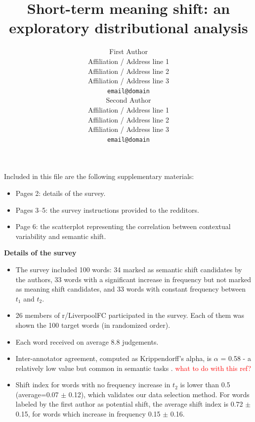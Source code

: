 \documentclass[11pt,a4paper]{article}
\title{Short-term meaning shift: an exploratory distributional analysis}
\author{First Author \\
  Affiliation / Address line 1 \\
  Affiliation / Address line 2 \\
  Affiliation / Address line 3 \\
  {\tt email@domain} \\\And
  Second Author \\
  Affiliation / Address line 1 \\
  Affiliation / Address line 2 \\
  Affiliation / Address line 3 \\
  {\tt email@domain} \\}
\date{}
\begin{document}
\maketitle


\begin{minipage}{15cm}
Included in this file are the following supplementary materials:
\begin{itemize}
\item Pages 2: details of the survey.
\item Pages 3--5: the survey instructions provided to the redditors.
\item Page 6: the scatterplot representing the correlation between contextual variability and semantic shift.

\end{itemize}

\end{minipage}

\pagebreak
\clearpage


\begin{minipage}{15cm}

\textbf{Details of the survey}

\begin{itemize}
\item The survey included 100 words: 34 marked as semantic shift candidates by the authors, 33 words
with a significant increase in frequency but not marked as meaning
shift candidates, and 33 words with constant frequency between $t_1$
and $t_2$.
\item 26 members of r/LiverpoolFC participated in the survey. Each of them was shown the 100 target words (in randomized order).
\item Each word received on average 8.8 judgements.
\item Inter-annotator agreement, computed as Krippendorff's alpha, is $\alpha$ = 0.58 - a relatively low value but common in semantic tasks \cite{artstein2008inter}. \textcolor{red}{what to do with this ref?}
\item Shift index for words with no frequency increase in $t_2$ is lower than 0.5 (average=0.07 $\pm$ 0.12), which validates our data selection method. For words labeled by the first author as potential shift, the average shift index is 0.72 $\pm$ 0.15, for words which increase in frequency 0.15 $\pm$ 0.16.
\end{itemize}



\end{minipage}
\end{document}
